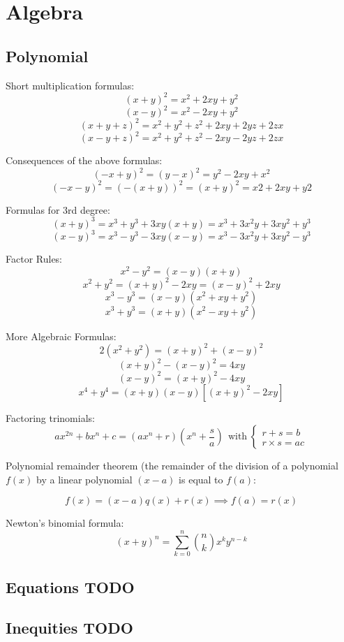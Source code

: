 \chapter{Algebra}

\section{Polynomial}
Short multiplication formulas:
$$(x + y)^2 = x^2 + 2xy + y^2$$
$$(x - y)^2 = x^2 - 2xy + y^2$$ 
$$(x + y + z)^2 = x^2 + y^2 + z^2 + 2xy + 2yz + 2zx$$ 
$$(x - y + z)^2 = x^2 + y^2 + z^2 - 2xy - 2yz + 2zx$$ 

Consequences of the above formulas:
$$(-x + y)^2 = (y - x)^2 = y^2 - 2xy + x^2$$
$$(-x - y)^2 = (-(x + y))^2 = (x + y)^2 = x2 + 2xy + y2$$

Formulas for 3rd degree:
$$(x + y)^3 = x^3 + y^3 + 3xy(x + y) = x^3 + 3x^2y + 3xy^2 + y^3$$
$$(x - y)^3 = x^3 - y^3 - 3xy(x - y) = x^3 - 3x^2y + 3xy^2 - y^3$$

Factor Rules:
$$x^2 - y^2 = (x - y)(x + y)$$
$$x^2 + y^2 = (x + y)^2 - 2xy = (x - y)^2 + 2xy$$
$$x^3 - y^3 = (x - y)(x^2 + xy + y^2)$$
$$x^3 + y^3 = (x + y)(x^2 - xy + y^2)$$

More Algebraic Formulas:
$$2(x^2 + y^2) = (x + y)^2 + (x - y)^2$$
$$(x + y)^2 - (x - y)^2 = 4xy$$
$$(x - y)^2 = (x + y)^2 - 4xy$$
$$x^4 + y^4 = (x + y)(x - y)[(x + y)^2 - 2xy]$$

Factoring trinomials:
$$ ax^{2n} + bx^n + c = (ax^n + r)(x^n + \frac{s}{a}) ~~ \text{with} ~ \begin{cases} 
                                                                  r + s = b \\
                                                                  r \times s = ac
                                                                 \end{cases}
$$

Polynomial remainder theorem (the remainder of the division of a polynomial $f(x)$ by a linear polynomial ${(x-a)}$ is equal to $f(a)$:

$$ f(x) = (x-a)q(x) + r(x) \implies f(a) = r(x) $$


Newton's binomial formula:
\[ (x+y)^n = \sum_{k=0}^{n}\binom{n}{k}x^ky^{n-k} \]

\section{Equations TODO}

\section{Inequities TODO}
